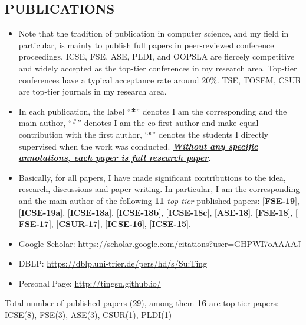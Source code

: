 \documentclass[margin]{res}
\begin{document}
\begin{resume}
\section{PUBLICATIONS}
\begin{itemize}[leftmargin=*]
    \item Note that the tradition of publication in computer science, and my field in particular, is mainly
to publish full papers in peer-reviewed conference proceedings. ICSE, FSE, ASE, PLDI, and OOPSLA are fiercely competitive and widely accepted as the top-tier conferences in my research area. Top-tier conferences have a typical acceptance rate around 20\%. TSE, TOSEM, CSUR are top-tier journals in my research area.
    \item In each publication, the label ``\textbf{*}'' denotes I am the corresponding and the main author, ``$^{\textbf{\#}}$'' denotes I am the co-first author and make equal contribution with the first author,  ``$^{\textbf{s}}$'' denotes the students I directly supervised when the work was conducted. \emph{\textbf{\underline{Without any specific annotations, each paper is full research paper}}}.
    \item Basically, for all papers, I have made significant contributions to the idea, research, discussions and paper writing. In particular, I am the corresponding and the main author of the following \textbf{11} \emph{top-tier} published papers: $[$\textbf{FSE-19}$]$, $[$\textbf{ICSE-19a}$]$, $[$\textbf{ICSE-18a}$]$, $[$\textbf{ICSE-18b}$]$, $[$\textbf{ICSE-18c}$]$, $[$\textbf{ASE-18}$]$, $[$\textbf{FSE-18}$]$, $[$\textbf{FSE-17}$]$, $[$\textbf{CSUR-17}$]$, $[$\textbf{ICSE-16}$]$, $[$\textbf{ICSE-15}$]$.
\end{itemize}

\begin{itemize}[leftmargin=*]
    \item Google Scholar: \url{https://scholar.google.com/citations?user=GHPWI7oAAAAJ}
    \item DBLP: \url{https://dblp.uni-trier.de/pers/hd/s/Su:Ting}
    \item Personal Page: \url{http://tingsu.github.io/}
\end{itemize}

 Total number of published papers (29), among them \textbf{16} are top-tier papers: ICSE(8), FSE(3), ASE(3), CSUR(1), PLDI(1)


\end{resume}
\end{document}
